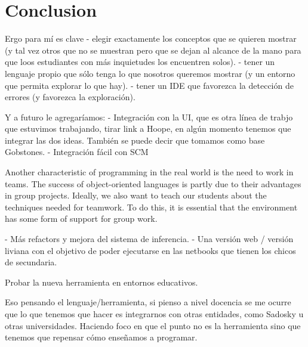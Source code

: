 \section{Conclusion}
\label{sec:conclusion}

Ergo para mí es clave 
- elegir exactamente los conceptos que se quieren mostrar (y tal vez otros que no se muestran pero que se dejan al alcance de la mano para que loos estudiantes con más inquietudes los encuentren solos).
- tener un lenguaje propio que sólo tenga lo que nosotros queremos mostrar (y un entorno que permita explorar lo que hay).
- tener un IDE que favorezca la detección de errores (y favorezca la exploración).


Y a futuro le agregaríamos:
- Integración con la UI, que es otra línea de trabjo que estuvimos trabajando, tirar link a Hoope, en algún momento tenemos que integrar las dos ideas. También se puede decir que tomamos como base Gobstones.
- Integración fácil con SCM

Another characteristic of programming in the real world is the need to work in
teams. The success of object-oriented languages is partly due to their advantages in
group projects. Ideally, we also want to teach our students about the techniques
needed for teamwork. To do this, it is essential that the environment has some form
of support for group work. \cite{kolling_problem_1999}

- Más refactors y mejora del sistema de inferencia.
- Una versión web / versión liviana con el objetivo de poder ejecutarse en las netbooks que tienen los chicos de secundaria.

Probar la nueva herramienta en entornos educativos.

Eso pensando el lenguaje/herramienta, si pienso a nivel docencia se me ocurre que lo que tenemos que hacer es integrarnos con otras entidades, como Sadosky u otras universidades.
Haciendo foco en que el punto no es la herramienta sino que tenemos que repensar cómo enseñamos a programar.
